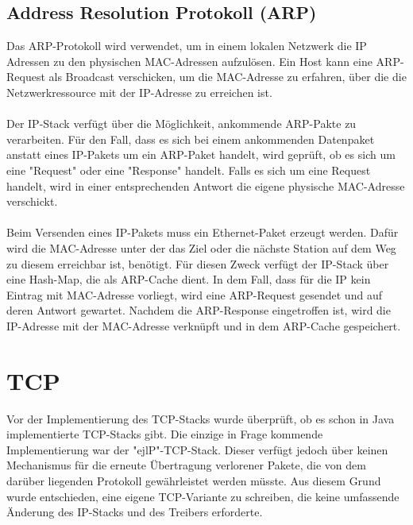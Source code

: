 \subsection{Address Resolution Protokoll (ARP)}
Das ARP-Protokoll wird verwendet, um in einem lokalen Netzwerk die IP Adressen zu den physischen MAC-Adressen aufzulösen. Ein Host kann eine ARP-Request als Broadcast verschicken, um die MAC-Adresse zu erfahren, über die die Netzwerkressource mit der IP-Adresse zu erreichen ist. \\\\
Der IP-Stack verfügt über die Möglichkeit, ankommende ARP-Pakte zu verarbeiten. Für den Fall, dass es sich bei einem ankommenden Datenpaket anstatt eines IP-Pakets um ein ARP-Paket handelt, wird geprüft, ob es sich um eine {}"Request"{} oder eine {}"Response"{} handelt. Falls es sich um eine Request handelt, wird in einer entsprechenden Antwort die eigene physische MAC-Adresse verschickt. \\\\
Beim Versenden eines IP-Pakets muss ein Ethernet-Paket erzeugt werden. Dafür wird die MAC-Adresse unter der das Ziel oder die nächste Station auf dem Weg zu diesem erreichbar ist, benötigt. Für diesen Zweck verfügt der IP-Stack über eine Hash-Map, die als ARP-Cache dient. In dem Fall, dass für die IP kein Eintrag mit MAC-Adresse vorliegt, wird eine ARP-Request gesendet und auf deren Antwort gewartet. Nachdem die ARP-Response eingetroffen ist, wird die IP-Adresse mit der MAC-Adresse verknüpft und in dem ARP-Cache gespeichert. 


 



\section{TCP}

Vor der Implementierung des TCP-Stacks wurde überprüft, ob es schon in Java implementierte TCP-Stacks gibt. Die einzige in Frage kommende Implementierung war der "{}ejlP"{}-TCP-Stack. Dieser verfügt jedoch über keinen Mechanismus für die erneute Übertragung verlorener Pakete, die von dem darüber liegenden Protokoll gewährleistet werden müsste. Aus diesem Grund wurde entschieden, eine eigene TCP-Variante zu schreiben, die keine umfassende Änderung des IP-Stacks und des Treibers erforderte.\cite{ejlP}




